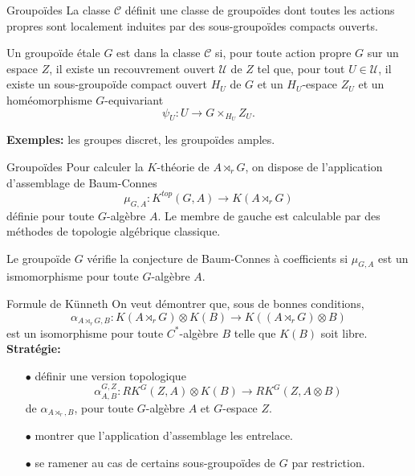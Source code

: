 \begin{frame}{Groupoïdes}
La classe $\mathcal C$ définit une classe de groupoïdes dont toutes les actions propres sont localement induites par des sous-groupoïdes compacts ouverts. 
\vspace{0.3 cm}
\begin{definitionfr}
Un groupoïde étale $G$ est dans la classe $\mathcal C$ si, pour toute action propre $G$ sur un espace $Z$, il existe un recouvrement ouvert $\mathcal U$ de $Z$ tel que, pour tout $U\in\mathcal U$, il existe un sous-groupoïde compact ouvert $H_U$ de $G$ et un $H_U$-espace $Z_U$ et un homéomorphisme $G$-equivariant
\[\psi_U : U \rightarrow G\times_{H_U} Z_U.\] 
\end{definitionfr}
\vspace{0.3 cm}
\textbf{Exemples:} les groupes discret, les groupoïdes amples.

\end{frame}

\begin{frame}{Groupoïdes}
Pour calculer la $K$-théorie de $A\rtimes_r G$, on dispose de l'application d'assemblage de Baum-Connes
\[\mu_{G,A} : K^{top}(G,A) \rightarrow K(A \rtimes_r G)\]
définie pour toute $G$-algèbre $A$. Le membre de gauche est calculable par des méthodes de topologie algébrique classique.
\vspace{0.3 cm}
\begin{conj}
Le groupoïde $G$ vérifie la conjecture de Baum-Connes à coefficients si $\mu_{G,A}$ est un ismomorphisme pour toute $G$-algèbre $A$.
\end{conj}

\end{frame}

\begin{frame}{Formule de Künneth}
On veut démontrer que, sous de bonnes conditions,  
\[\alpha_{A\rtimes_r G,B} : K(A\rtimes_r G)\otimes K(B) \rightarrow K((A\rtimes_r G)\otimes B)\]
est un isomorphisme pour toute $C^*$-algèbre $B$ telle que $K(B)$ soit libre.\\
\vspace{0.3 cm}
\textbf{Stratégie:}
\begin{itemize}
\item[$\bullet$] définir une version topologique 
\[\alpha_{A,B}^{G,Z} : RK^G(Z,A)\otimes K(B) \rightarrow RK^G(Z,A\otimes B)\]
de $\alpha_{A\rtimes_r,B}$, pour toute $G$-algèbre $A$ et $G$-espace $Z$.
\item[$\bullet$] montrer que l'application d'assemblage les entrelace.
\item[$\bullet$] se ramener au cas de certains sous-groupoïdes de $G$ par restriction.
\end{itemize}
\end{frame}

